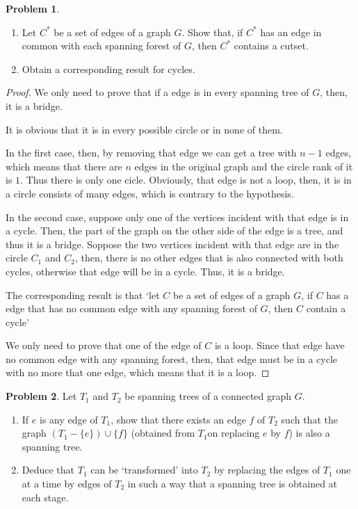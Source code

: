 \documentclass[a4paper,11pt]{article}%
\theoremstyle{remark}
\theoremstyle{definition}
\newtheorem{problem}{Problem}[subsection]
\begin{document}
\begin{problem}
    \begin{enumerate}
    \item Let $C^*$ be a set of edges of a graph $G$. Show that, if $C^*$
    has an edge in common with each spanning forest of $G$, then $C^*$
    contains a cutset.
    \item Obtain a corresponding result for cycles.
    \end{enumerate}
    \begin{proof}
        We only need to prove that if a edge is in every spanning tree of $G$, 
        then, it is a bridge.

        It is obvious that it is in every possible circle or in none of them.

        In the first case, then, by removing that edge we can get a 
        tree with $n-1$ edges, which means that there are $n$ edges in 
        the original graph and the circle rank of it is $1$. Thus there 
        is only one cicle. Obviously, that edge is not a loop, then,
        it is in a circle consists of many edges, which is contrary to the hypothesis.

        In the second case, suppose only one of the vertices incident with that edge 
        is in  a cycle. Then, the part of the graph on the other side of 
        the edge is a tree, and thus it is a bridge. 
        Soppose the two vertices incident with that edge are in the circle $C_1$
        and $C_2$, then, there is no other edges that is also connected with 
        both cycles, otherwise that edge will be in a cycle. Thus, it is a 
        bridge.

        The corresponding result is that `let $C$ be a set of edges of a graph 
        $G$, if $C$ has a edge that has no common edge with any spanning forest of $G$, then  
        $C$ contain a cycle' 

        We only need to prove that one of the edge of $C$ is a loop.
        Since that edge have no common edge with any spanning forest,
        then, that edge must be in a cycle with no more that one edge, which means 
        that it is a loop.
    \end{proof}
\end{problem}
\begin{problem}
    Let $T_1$ and $T_2$ be spanning trees of a connected graph $G$.
    \begin{enumerate}
        \item If $e$ is any edge of $T_1$, show that there exists 
        an edge $f$ of $T_2$ such that the graph $(T_1-\{e\})\cup \{f\}$
        (obtained from $T_1 $on replacing $e$ by $f$)
        is also a spanning tree.
        \item Deduce that $T_1$ can be `transformed' into $T_2$ by replacing the edges of $T_1$
        one at a time by edges of $T_2$ in such a way that a spanning tree is obtained at 
        each stage.
    \end{enumerate}
\end{problem}
\end{document}

